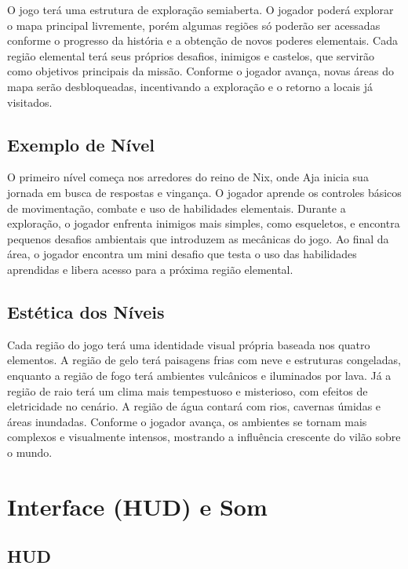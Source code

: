 \documentclass[12pt, a4paper]{article} %
\begin{document}
	O jogo terá uma estrutura de exploração semiaberta. O jogador poderá explorar o mapa principal livremente, porém algumas regiões só poderão ser acessadas conforme o progresso da história e a obtenção de novos poderes elementais.
	Cada região elemental terá seus próprios desafios, inimigos e castelos, que servirão como objetivos principais da missão. Conforme o jogador avança, novas áreas do mapa serão desbloqueadas, incentivando a exploração e o retorno a locais já visitados.
	
	\subsection{Exemplo de Nível}
	
	O primeiro nível começa nos arredores do reino de Nix, onde Aja inicia sua jornada em busca de respostas e vingança. O jogador aprende os controles básicos de movimentação, combate e uso de habilidades elementais.
	Durante a exploração, o jogador enfrenta inimigos mais simples, como esqueletos, e encontra pequenos desafios ambientais que introduzem as mecânicas do jogo. Ao final da área, o jogador encontra um mini desafio que testa o uso das habilidades aprendidas e libera acesso para a próxima região elemental.
	
	\subsection{Estética dos Níveis}
	
	Cada região do jogo terá uma identidade visual própria baseada nos quatro elementos. A região de gelo terá paisagens frias com neve e estruturas congeladas, enquanto a região de fogo terá ambientes vulcânicos e iluminados por lava.
	Já a região de raio terá um clima mais tempestuoso e misterioso, com efeitos de eletricidade no cenário. A região de água contará com rios, cavernas úmidas e áreas inundadas. Conforme o jogador avança, os ambientes se tornam mais complexos e visualmente intensos, mostrando a influência crescente do vilão sobre o mundo.
	
	\newpage
	
	
	\section{Interface (HUD) e Som}
	
	\subsection{HUD}
	
\end{document}
